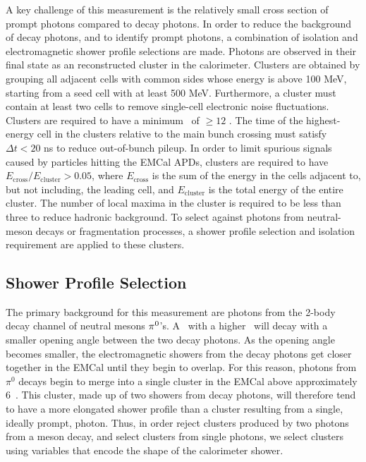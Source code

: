 A key challenge of this measurement is the relatively small cross section of prompt photons compared to decay photons. In order to reduce the background of decay photons, and to identify prompt photons, a combination of isolation and electromagnetic shower profile selections are made. Photons are observed in their final state as an reconstructed cluster in the calorimeter. Clusters are obtained by grouping all adjacent cells with common sides whose energy is above {100 MeV}, starting from a seed cell with at least {500 MeV}. Furthermore, a cluster must contain at least two cells to remove single-cell electronic noise fluctuations. Clusters are required to have a minimum \pt~of \ptgamma $\geq 12$ \GeVc. The time of the highest-energy cell in the clusters relative to the main bunch crossing must satisfy $\Delta t < 20$ ns to reduce out-of-bunch pileup. In order to limit spurious signals caused by particles hitting the EMCal APDs, clusters are required to have $E_{\mathrm{cross}}/E_{\mathrm{cluster}}>0.05$, where $E_{\mathrm{cross}}$ is the sum of the energy in the cells adjacent to, but not including, the leading cell, and $E_{\mathrm{cluster}}$ is the total energy of the entire cluster. The number of local maxima in the cluster is required to be less than three to reduce hadronic background. To select against photons from neutral-meson decays or fragmentation processes, a shower profile selection and isolation requirement are applied to these clusters. 

\subsection{Shower Profile Selection}
The primary background for this measurement are photons from the 2-body decay channel of neutral mesons $\pi^0$'s. A \pizero~with a higher \pt~will decay  with a smaller opening angle between the two decay photons. As the opening angle becomes smaller, the electromagnetic showers from the decay photons get closer together in the EMCal until they begin to overlap. For this reason, photons from $\pi^0$ decays begin to merge into a single cluster in the EMCal above approximately 6~\GeVc. This cluster, made up of two showers from decay photons, will therefore tend to have a more elongated shower profile than a cluster resulting from a single, ideally prompt, photon. Thus, in order reject clusters produced by two photons from a meson decay, and select clusters from single photons, we select clusters using variables that encode the shape of the calorimeter shower. 

